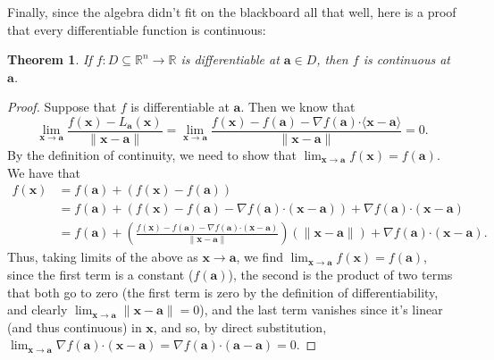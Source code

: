 \documentclass[12pt,letterpaper]{article}
\newtheorem{theorem}{Theorem}
\newcommand{\R}{\mathbb{R}}
\newcommand{\x}{\mathbf{x}}
\newcommand{\aaa}{\mathbf{a}}
\newcommand{\dotp}{\boldsymbol{\cdot}}
\begin{document}
Finally, since the algebra didn't fit on the blackboard all that well, here is a proof that every differentiable function is continuous:
\begin{theorem}
If $f:D\subseteq \R^n\to \R$ is differentiable at $\aaa\in D$, then $f$ is continuous at $\aaa$.
\end{theorem}
\begin{proof}
Suppose that $f$ is differentiable at $\aaa$. Then we know that
\[
\lim_{\x\to \aaa}\frac{f(\x)-L_\aaa(\x)}{\lVert \x-\aaa\rVert} = \lim_{\x\to\aaa}\frac{f(\x)-f(\aaa)-\nabla f(\aaa)\dotp \langle \x-\aaa\rangle}{\lVert\x - \aaa\rVert} = 0.
\]
By the definition of continuity, we need to show that $\displaystyle \lim_{\x\to\aaa}f(\x) = f(\aaa)$. We have that
\begin{align*}
f(\x) & = f(\aaa) + (f(\x)-f(\aaa))\\
 & = f(\aaa) + \left(f(\x) - f(\aaa) - \nabla f(\aaa)\dotp (\x-\aaa)\right) + \nabla f(\aaa)\dotp (\x-\aaa)\\
 & = f(\aaa) +\left(\frac{f(\x)-f(\aaa)-\nabla f(\aaa)\dotp (\x-\aaa)}{\lVert\x-\aaa\rVert}\right)(\lVert\x-\aaa\rVert) + \nabla f(\aaa)\dotp (\x-\aaa).
\end{align*}
Thus, taking limits of the above as $\x\to\aaa$, we find $\displaystyle \lim_{\x\to\aaa}f(\x) = f(\aaa)$, since the first term is a constant ($f(\aaa)$), the second is the product of two terms that both go to zero (the first term is zero by the definition of differentiability, and clearly $\lim_{\x\to\aaa}\lVert\x-\aaa\rVert = 0$), and the last term vanishes since it's linear (and thus continuous) in $\x$, and so, by direct substitution, $\lim_{\x\to\aaa}\nabla f(\aaa)\dotp(\x-\aaa) = \nabla f(\aaa)\dotp(\aaa-\aaa) = 0$.
\end{proof}
\pagebreak
\end{document}
